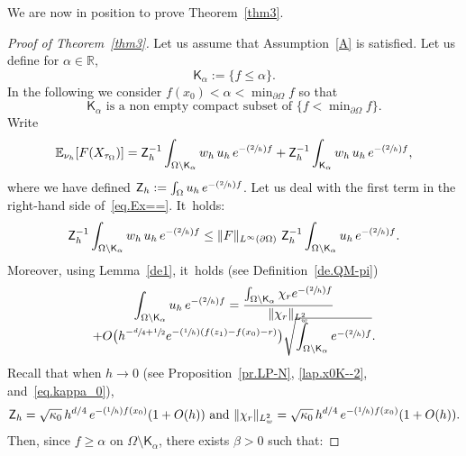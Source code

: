 \documentclass[JEP,XML,SOM,Unicode,NoEqCountersInSection,NoFloatCountersInSection,published]{cedram}
\newcommand{\Psfrac}[2]{(\sfrac{#1}{#2})}
\theoremstyle{plain}
\theoremstyle{definition}
\begin{document}
We are now in position to prove Theorem~\ref{thm3}.

\begin{proof}[Proof of Theorem~\ref{thm3}]
Let us assume that Assumption~\ref{A} is satisfied.
Let us define for $\alpha \in \mathbb R$,\vspace*{-3pt}\enlargethispage{.5\baselineskip}
\[
\mathsf K_{\alpha}:=\{f\le \alpha\}.
\]
In the following we consider $f(x_0)<\alpha < \min_{\partial \Omega}f$ so that\vspace*{-1pt}
\[
\mathsf K_{\alpha} \text{ is a non empty compact subset of } \{f<\min\nolimits_{\partial \Omega}f\}.
\]
Write\vspace*{-3pt}
\begin{equation}\label{eq.Ex==}
\mathbb E_{\nu_h} [F(X_{\tau_{\Omega}})]={\mathsf Z_h^{-1}} \int_{\Omega \setminus \mathsf K_{\alpha}}w_h\,
{u}_h\, e^{-\Psfrac{2}{h}f} + {\mathsf Z_h^{-1}} \int_{\mathsf K_{\alpha}} w_h\, {u}_h\, e^{-\Psfrac{2}{h}f},
\end{equation}
where we have defined $ \mathsf Z_h:=\int_{\Omega }
{u}_h\, e^{-\Psfrac{2}{h}f}$.
Let us deal with the first term in the right-hand side of~\eqref{eq.Ex==}. It~holds:\vspace*{-3pt}
\[
{\mathsf Z_h^{-1}} \int_{\Omega \setminus \mathsf K_{\alpha}}w_h\,
{u}_h\, e^{-\Psfrac{2}{h}f} \le \Vert F\Vert _{L^\infty(\partial \Omega)}\ {\mathsf Z_h^{-1}} \int_{\Omega \setminus \mathsf K_{\alpha}}
{u}_h\, e^{-\Psfrac{2}{h}f}.
\]
Moreover, using Lemma~\ref{de1}, it~holds (see Definition~\ref{de.QM-pi})\vspace*{-5pt}
\begin{multline*}
\int_{\Omega \setminus \mathsf K_{\alpha}}
{u}_h\, e^{-\Psfrac{2}{h}f}=\frac{\int_{\Omega \setminus \mathsf K_{\alpha}} \chi_r e^{-\Psfrac{2}{h}f} }{\Vert \chi_r\Vert_{L^2_w}}\\[-8pt] +O\bigl(h^{-\sfrac d4 +\sfrac 12} e^{-\Psfrac 1h (f(z_1)-f(x_0)-r)} \bigr) \sqrt { \int_{\Omega \setminus \mathsf K_{\alpha}}
e^{-\Psfrac{2}{h}f}}.
\end{multline*}
Recall that when $h\to 0$ (see Proposition~\ref{pr.LP-N}, \eqref{lap.x0K--2}, and~\eqref{eq.kappa_0}),\vspace*{-3pt}
\[
\mathsf Z_h=\sqrt{\kappa_0}\, h^{d/4}\, e^{-\Psfrac 1h f(x_0)}(1+O(h)) \ \text{and} \ \Vert \chi_r\Vert_{L^2_w}=\sqrt{\kappa_0}\, h^{d/4}\, e^{-\Psfrac 1h f(x_0)}(1+O(h)).
\]
Then, since $f\ge \alpha$ on $\Omega \setminus \mathsf K_{\alpha}$, there exists $\beta >0$ such that:\vspace*{-3pt}

\end{proof}
\end{document}

